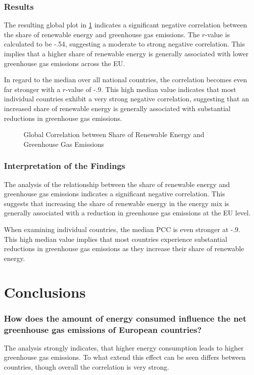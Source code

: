 \documentclass{article}
\begin{document}
\subsubsection*{Results}
The resulting global plot in \cref{plt:global_share_vs_emissions} indicates a significant negative correlation between the share
of renewable energy and greenhouse gas emissions. The $r$-value is calculated to be -.54, suggesting a moderate to strong
negative correlation. This implies that a higher share of renewable energy is generally associated with lower greenhouse gas emissions across the EU.

In regard to the median over all national countries, the correlation becomes even far stronger with a $r$-value of -.9.
This high median value indicates that most individual countries exhibit a very strong negative correlation,
suggesting that an increased share of renewable energy is generally associated with substantial reductions in greenhouse gas emissions.

\begin{figure}
    \centering
    \resizebox{.6\textwidth}{!}{}
    \caption{Global Correlation between Share of Renewable Energy and Greenhouse Gas Emissions}
    \label{plt:global_share_vs_emissions}
\end{figure}

\subsubsection*{Interpretation of the Findings}
The analysis of the relationship between the share of renewable energy and greenhouse gas emissions indicates a significant negative correlation.
This suggests that increasing the share of renewable energy in the energy mix is generally associated with a reduction in greenhouse gas
emissions at the EU level.

When examining individual countries, the median PCC is even stronger at -.9. This high median value implies that most countries experience
substantial reductions in greenhouse gas emissions as they increase their share of renewable energy.

\section*{Conclusions}
\subsubsection*{How does the amount of energy consumed influence the net greenhouse gas emissions of European countries?}
The analysis strongly indicates, that higher energy consumption leads to higher greenhouse gas emissions.
To what extend this effect can be seen differs between countries, though overall the correlation is very strong.
\end{document}

